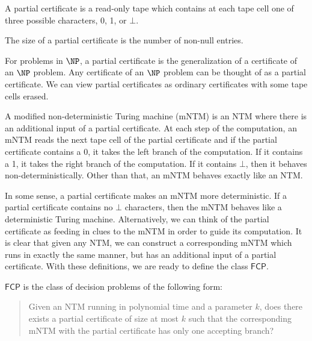 \documentclass[runningheads,a4paper]{llncs}
\begin{document}
\begin{definition}
A partial certificate is a read-only tape which contains at each tape cell one of three possible characters, 0, 1, or $\bot$.
\end{definition}

\begin{definition}
The size of a partial certificate is the number of non-null entries. 
\end{definition}

For problems in $\NP$, a partial certificate is the generalization of a certificate of an $\NP$ problem. Any certificate of an $\NP$ problem can be thought of as a partial certificate. We can view partial certificates as ordinary certificates with some tape cells erased.

\begin{definition}
A modified non-deterministic Turing machine (mNTM) is an NTM where there is an additional input of a partial certificate. At each step of the computation, an mNTM reads the next tape cell of the partial certificate and if the partial certificate contains a 0, it takes the left branch of the computation. If it contains a 1, it takes the right branch of the computation. If it contains $\bot$, then it behaves non-deterministically. Other than that, an mNTM behaves exactly like an NTM.
\end{definition}

In some sense, a partial certificate makes an mNTM more deterministic. If a partial certificate contains no $\bot$ characters, then the mNTM behaves like a deterministic Turing machine. Alternatively, we can think of the partial certificate as feeding in clues to the mNTM in order to guide its computation. It is clear that given any NTM, we can construct a corresponding mNTM which runs in exactly the same manner, but has an additional input of a partial certificate. With these definitions, we are ready to define the class $\mathsf{FCP}$.

\begin{definition}
$\mathsf{FCP}$ is the class of decision problems of the following form:
\begin{quote}
Given an NTM running in polynomial time and a parameter $k$, does there exists a partial certificate of size at most $k$ such that the corresponding mNTM with the partial certificate has only one accepting branch?
\end{quote}
\end{definition}
\end{document}

